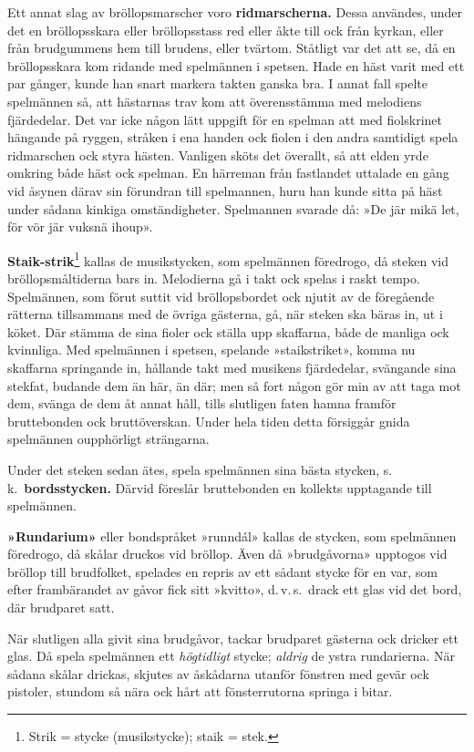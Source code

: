 \begin{multicols}{2}
Ett annat slag av bröllopsmarscher voro \textbf{ridmarscherna.} Dessa
användes, under det en bröllopsskara eller bröllopsstass red eller
åkte till ock från kyrkan, eller från brudgummens hem till brudens,
eller tvärtom. Ståtligt var det att se, då en bröllopsskara kom ridande
med spelmännen i spetsen. Hade en häst varit med ett par gånger, kunde
han snart markera takten ganska bra. I annat fall spelte spelmännen
så, att hästarnas trav kom att överensstämma med melodiens fjärdedelar.
Det var icke någon lätt uppgift för en spelman att med fiolskrinet
hängande på ryggen, stråken i ena handen ock fiolen i den andra samtidigt
spela ridmarschen ock styra hästen. Vanligen sköts det överallt, så
att elden yrde omkring både häst ock spelman. En härreman från fastlandet
uttalade en gång vid åsynen därav sin förundran till spelmannen, huru
han kunde sitta på häst under sådana kinkiga omständigheter. Spelmannen
svarade då: »De jär mikä let, för vör jär vuksnä ihoup».

\textbf{Staik-strik}\footnote{Strik = stycke (musikstycke); staik = stek.}
kallas de musikstycken, som spelmännen föredrogo, då steken vid bröllops\-mål\-tid\-erna
bars in. Melodierna gå i  takt ock spelas i raskt tempo.
Spelmännen, som förut suttit vid bröllopsbordet ock njutit av de föregående
rätterna tillsammans med de övriga gästerna, gå, när steken ska bäras
in, ut i köket. Där stämma de sina fioler ock ställa upp skaffarna,
både de manliga ock kvinnliga. Med spelmännen i spetsen, spelande
»staikstriket», komma nu skaffarna springande in, hållande takt med
musikens fjärdedelar, svängande sina stekfat, budande dem än här,
än där; men så fort någon gör min av att taga mot dem, svänga de dem
åt annat håll, tills slutligen faten hamna framför bruttebonden ock
bruttöverskan. Under hela tiden detta försiggår gnida spelmännen oupphörligt
strängarna.

Under det steken sedan ätes, spela spelmännen sina bästa stycken,
s.\,k.\ \textbf{bordsstycken.} Därvid föreslår bruttebonden en kollekts
upptagande till spelmännen.

\textbf{»Rundarium»} eller bondspråket »runndál» kallas de stycken,
som spelmännen föredrogo, då skålar druckos vid bröllop. Även då »brudgåvorna»
upptogos vid bröllop till brudfolket, spelades en repris av ett sådant
stycke för en var, som efter frambärandet av gåvor fick sitt »kvitto»,
d.\,v.\,s.\ drack ett glas vid det bord, där brudparet satt.

När slutligen alla givit sina brudgåvor, tackar brudparet gästerna
ock dricker ett glas. Då spela spelmännen ett \textit{högtidligt}
stycke; \textit{aldrig} de ystra rundarierna. När sådana skålar drickas,
skjutes av åskådarna utanför fönstren med gevär ock pistoler, stundom
så nära ock hårt att fönsterrutorna springa i bitar.
\end{multicols}

